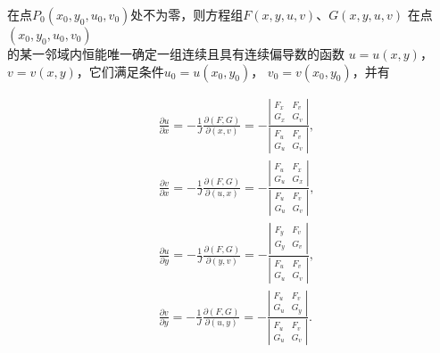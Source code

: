 \documentclass[12pt, a4paper]{article}
\numberwithin{equation}{section}
\begin{document}
    在点\(P_0\left(x_0,y_0,u_0,v_0\right)\)处不为零，则方程组\(F\left(x,y,u,v\right)\)、\(G\left(x,y,u,v\right)\)
    在点\(\left(x_0,y_0,u_0,v_0\right)\)\\的某一邻域内恒能唯一确定一组连续且具有连续偏导数的函数
    \(u=u\left(x,y\right)\)，\(v=v\left(x,y\right)\)，它们满足条件\(u_0=u\left(x_0,y_0\right)\)，
    \(v_0=v\left(x_0,y_0\right)\)，并有

    \begin{equation}
        \begin{aligned}
            & \frac{\partial u}{\partial x}=-\frac{1}{J} \frac{\partial(F, G)}{\partial(x, v)}=-\frac{\left|\begin{array}{ll}
            F_x & F_v \\
            G_x & G_v
            \end{array}\right|}{\left|\begin{array}{ll}
            F_u & F_v \\
            G_u & G_v
            \end{array}\right|}, \\
            & \frac{\partial v}{\partial x}=-\frac{1}{J} \frac{\partial(F, G)}{\partial(u, x)}=-\frac{\left|\begin{array}{ll}
            F_u & F_x \\
            G_u & G_x
            \end{array}\right|}{\left|\begin{array}{ll}
            F_u & F_v \\
            G_u & G_v
            \end{array}\right|}, \\
            & \frac{\partial u}{\partial y}=-\frac{1}{J} \frac{\partial(F, G)}{\partial(y, v)}=-\frac{\left|\begin{array}{ll}
            F_y & F_v \\
            G_y & G_v
            \end{array}\right|}{\left|\begin{array}{ll}
            F_u & F_v \\
            G_u & G_v
            \end{array}\right|}, \\
            & \frac{\partial v}{\partial y}=-\frac{1}{J} \frac{\partial(F, G)}{\partial(u, y)}=-\frac{\left|\begin{array}{ll}
            F_u & F_v \\
            G_u & G_y
            \end{array}\right|}{\left|\begin{array}{ll}
            F_u & F_v \\
            G_u & G_v
            \end{array}\right|}.
        \end{aligned}
    \end{equation}
\end{document}
